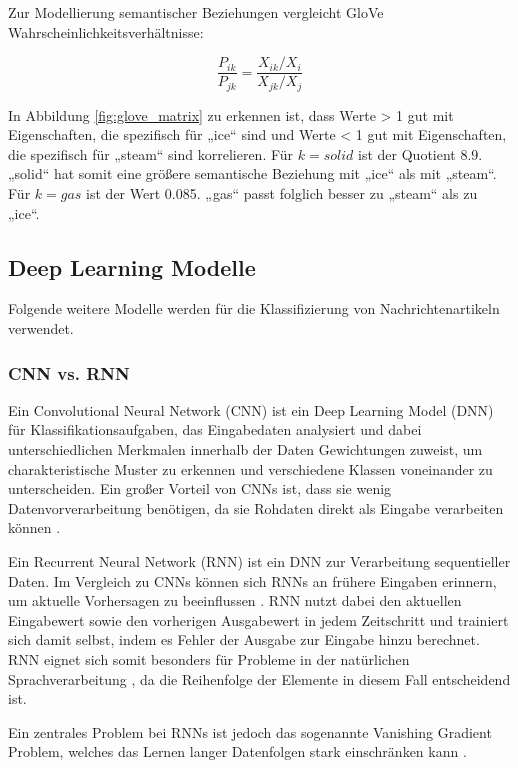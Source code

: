 Zur Modellierung semantischer Beziehungen vergleicht GloVe Wahrscheinlichkeitsverhältnisse:

\[
\frac{P_{ik}}{P_{jk}} = \frac{X_{ik} / X_i}{X_{jk} / X_j}
\]

In Abbildung \ref{fig:glove_matrix} zu erkennen ist, dass Werte > 1 gut mit Eigenschaften, die spezifisch für „ice“ sind
und Werte < 1 gut mit Eigenschaften, die spezifisch für „steam“ sind korrelieren.
Für $k=solid$ ist der Quotient 8.9. „solid“ hat somit eine größere semantische Beziehung mit „ice“ als mit „steam“.
Für $k=gas$ ist der Wert 0.085. „gas“ passt folglich besser zu „steam“ als zu „ice“.


\subsection{Deep Learning Modelle}
\label{sec:deep_learning_modelle}

Folgende weitere Modelle werden für die Klassifizierung von Nachrichtenartikeln verwendet.

\subsubsection{CNN vs. RNN}

Ein Convolutional Neural Network (CNN) ist ein Deep Learning Model (DNN) für Klassifikationsaufgaben,
das Eingabedaten analysiert und dabei unterschiedlichen Merkmalen innerhalb der Daten Gewichtungen zuweist,
um charakteristische Muster zu erkennen und verschiedene Klassen voneinander zu unterscheiden.
Ein großer Vorteil von CNNs ist, dass sie wenig Datenvorverarbeitung benötigen, da sie Rohdaten direkt als Eingabe verarbeiten 
können \cite{aslam2022}.

Ein Recurrent Neural Network (RNN) ist ein DNN zur Verarbeitung sequentieller Daten.
Im Vergleich zu CNNs können sich RNNs an frühere Eingaben erinnern, um aktuelle Vorhersagen zu beeinflussen \cite{Deshai:2023aa}.
RNN nutzt dabei den aktuellen Eingabewert sowie den vorherigen Ausgabewert in jedem Zeitschritt 
und trainiert sich damit selbst, indem es Fehler der Ausgabe zur Eingabe hinzu berechnet.
RNN eignet sich somit besonders für Probleme in der natürlichen Sprachverarbeitung \cite{Wang:2020aa}, 
da die Reihenfolge der Elemente in diesem Fall entscheidend ist.

Ein zentrales Problem bei RNNs ist jedoch das sogenannte Vanishing Gradient Problem, welches das Lernen 
langer Datenfolgen stark einschränken kann \cite{aslam2022}.

